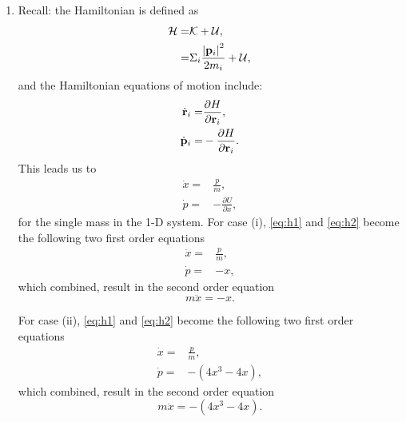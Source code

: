 \documentclass{article}
\begin{document}
\begin{enumerate}[label=\alph*)]
  \item Recall: the Hamiltonian is defined as
        \begin{align*}
          \mathcal{H} = & \mathcal{K} + \mathcal{U}, \\ 
          = & \Sigma_i \frac{\left|\mathbf{p}_i\right|^2}{2 m_i} + \mathcal{U},
        \end{align*}
        and the Hamiltonian equations of motion include:
        \begin{align*}
          \dot{\mathbf{r}}_i = & \frac{\partial H}{\partial \mathbf{r}_i}, \\
          \dot{\mathbf{p}}_i = & -\frac{\partial H}{\partial \mathbf{r}_i}.
        \end{align*}
        This leads us to
        \begin{align} \label{eq:h1}
          \dot{x} = & \frac{p}{m}, \\ \label{eq:h2}
          \dot{p} = & -\frac{\partial U}{\partial x},
        \end{align}
        for the single mass in the 1-D system.
        For case (i), \eqref{eq:h1} and \eqref{eq:h2} become the following two first order equations
        \begin{align*}
          \dot{x} = & \frac{p}{m}, \\ \label{eq:h2}
          \dot{p} = & -x,
        \end{align*}
        which combined, result in the second order equation
        \begin{equation*}
        m\ddot{x} = -x.
        \end{equation*}

    For case (ii), \eqref{eq:h1} and \eqref{eq:h2} become the following two first order equations
        \begin{align*}
          \dot{x} = & \frac{p}{m}, \\ \label{eq:h2}
          \dot{p} = & -\left(4x^3 - 4x \right),
        \end{align*}
        which combined, result in the second order equation
        \begin{equation*}
        m\ddot{x} = -\left(4x^3 - 4x \right).
        \end{equation*}


\end{enumerate}
\end{document}
